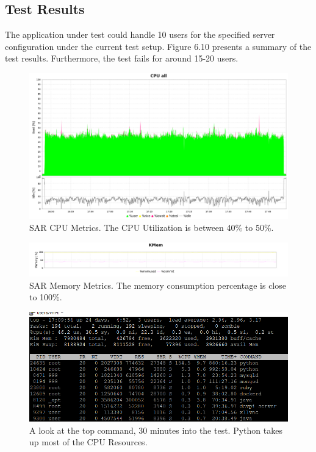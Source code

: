 \documentclass[12pt]{report}
\begin{document}
\subsection{Test Results}
The application under test could handle 10 users for the specified server configuration under the current test setup. Figure 6.10 presents a summary of the test results. Furthermore, the test fails for around 15-20 users.
\clearpage
\begin{figure}[h!]
	\centering
	\includegraphics[width=\textwidth,height=\textheight,keepaspectratio]{intro/cpu_harshit_new.png}
	\caption{SAR CPU Metrics. The CPU Utilization is between 40\% to 50\%.}
\end{figure}
\begin{figure}[h!]
	\centering
	\includegraphics[width=\textwidth,height=\textheight,keepaspectratio]{intro/mem_harshit_new.png}
	\caption{SAR Memory Metrics. The memory consumption percentage is close to 100\%.}
\end{figure}

\newpage
\begin{figure}[h!]
	\centering
	\includegraphics[width=\textwidth,height=\textheight,keepaspectratio]{Downloads/EkalavyaSummerInternship2019/latex-template/intro/S2_harshit_new.png}
	\caption{A look at the top command, 30 minutes into the test. Python takes up most of the CPU Resources.}
\end{figure}
\end{document}
